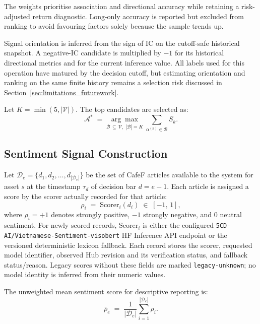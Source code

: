 The weights prioritise association and directional accuracy while retaining a
risk-adjusted return diagnostic. Long-only accuracy is reported but excluded
from ranking to avoid favouring factors solely because the sample trends up.

Signal orientation is inferred from the sign of IC on the cutoff-safe
historical snapshot. A negative-IC candidate is multiplied by $-1$ for its
historical directional metrics and for the current inference value. All labels
used for this operation have matured by the decision cutoff, but estimating
orientation and ranking on the same finite history remains a selection risk
discussed in Section~\ref{sec:limitations_futurework}.

Let $K=\min(5,|\mathcal{V}|)$. The top candidates are selected as:
\begin{equation}
    \mathcal{A}^{*} \;=\;
    \underset{\mathcal{B}\,\subseteq\,\mathcal{V},\;|\mathcal{B}|=K}
    {\arg\max}
    \;\sum_{\alpha^{(k)} \in \mathcal{B}} S_k.
    \label{eq:selection}
\end{equation}

\subsection{Sentiment Signal Construction}

Let $\mathcal{D}_e = \{d_1, d_2, \ldots, d_{|\mathcal{D}_e|}\}$ be the
set of CafeF articles available to the system for asset $s$ at the timestamp
$\tau_d$ of decision bar $d=e-1$.
Each article is assigned a score by the scorer actually recorded for that
article:
\begin{equation}
    \rho_i \;=\; \mathrm{Scorer}_i(d_i) \;\in\; [-1,\, 1],
\end{equation}
where $\rho_i = +1$ denotes strongly positive, $-1$ strongly negative,
and $0$ neutral sentiment. For newly scored records,
$\mathrm{Scorer}_i$ is either the configured
\texttt{5CD-AI/Vietnamese-Sentiment-visobert} HF Inference API endpoint or
the versioned deterministic lexicon fallback. Each record stores the scorer,
requested model identifier, observed Hub revision and its verification status,
and fallback status/reason. Legacy scores without these fields are marked
\texttt{legacy-unknown}; no model identity is inferred from their numeric values.

The unweighted mean sentiment score for descriptive reporting is:
\begin{equation}
    \bar{\rho}_e \;=\;
    \frac{1}{|\mathcal{D}_e|} \sum_{i=1}^{|\mathcal{D}_e|} \rho_i.
\end{equation}

